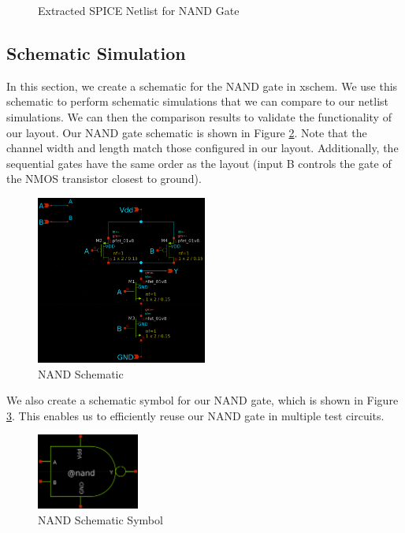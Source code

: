 \documentclass{article}
\begin{document}
	\begin{figure}[H]
		
		\caption{Extracted SPICE Netlist for NAND Gate}
		\label{fig::nand_netlist}
	\end{figure}
	
	\subsection{Schematic Simulation}
	
	In this section, we create a schematic for the NAND gate in xschem. We use this schematic to perform schematic simulations that we can compare to our netlist simulations. We can then the comparison results to validate the functionality of our layout. Our NAND gate schematic is shown in Figure \ref{fig::nand_schematic}. Note that the channel width and length match those configured in our layout. Additionally, the sequential gates have the same order as the layout (input B controls the gate of the NMOS transistor closest to ground).
	
	\begin{figure}[H]
		\centerline{\includegraphics[width=0.5\textwidth]{nand_schematic.png}}
		\caption{NAND Schematic}
		\label{fig::nand_schematic}
	\end{figure}
	
	\noindent We also create a schematic symbol for our NAND gate, which is shown in Figure \ref{fig::nand_symbol}. This enables us to efficiently reuse our NAND gate in multiple test circuits.
	
	\begin{figure}[H]
		\centerline{\includegraphics[width=0.3\textwidth]{nand_symbol.png}}
		\caption{NAND Schematic Symbol}
		\label{fig::nand_symbol}
	\end{figure}
	
\end{document}
